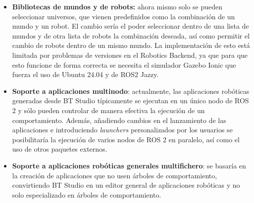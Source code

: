 \begin{itemize}

    \item \textbf{Bibliotecas de mundos y de robots:} ahora mismo solo se pueden seleccionar universos, que vienen predefinidos como la combinación de un mundo y un robot. El cambio sería el poder seleccionar dentro de una lista de mundos y de otra lista de robots la combinación deseada, así como permitir el cambio de robots dentro de un mismo mundo. La implementación de esto está limitada por problemas de versiones en el Robotics Backend, ya que para que esto funcione de forma correcta se necesita el simulador Gazebo Ionic que fuerza el uso de Ubuntu 24.04 y de ROS2 Jazzy.
    
    \item \textbf{Soporte a aplicaciones multinodo}: actualmente, las aplicaciones robóticas generadas desde BT Studio típicamente se ejecutan en un único nodo de ROS 2 y sólo pueden controlar de manera efectiva la ejecución de un comportamiento. Además, añadiendo cambios en el lanzamiento de las aplicaciones e introduciendo \textit{launchers} personalizados por los usuarios se posibilitaría la ejecución de varios nodos de ROS 2 en paralelo, así como el uso de otros paquetes externos.
    
    
    \item \textbf{Soporte a aplicaciones robóticas generales multifichero}: se basaría en la creación de aplicaciones que no usen árboles de comportamiento, convirtiendo BT Studio en un editor general de aplicaciones robóticas y no solo especializado en árboles de comportamiento.
\end{itemize}

